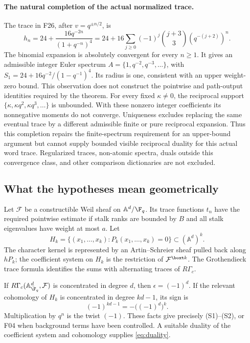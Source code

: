 \documentclass[11pt,a4paper]{article}
\newcommand{\A}{\mathbb A}\newcommand{\PP}{\mathbb P}\newcommand{\GL}{\mathrm{GL}}
\newcommand{\fid}[1]{\textsf{#1}}\newcommand{\gate}[1]{\textsf{#1}}
\theoremstyle{named}\newtheorem{finding}{Finding}[section]
\theoremstyle{definition}\newtheorem{definition}[finding]{Definition}
\theoremstyle{remark}\newtheorem{remark}[finding]{Remark}
\begin{document}
\paragraph{The natural completion of the actual normalized trace.}
The trace in \fid{F26}, after $v=q^{\pm n/2}$, is
\[
 h_n=24+\frac{16q^{-2n}}{(1+q^{-n})^4}
 =24+16\sum_{j\ge0}(-1)^j\binom{j+3}{3}
                   (q^{-(j+2)})^n.
\]
The binomial expansion is absolutely convergent for every $n\ge1$.
It gives an admissible integer Euler spectrum
$A=\{1,q^{-2},q^{-3},\ldots\}$, with
$S_1=24+16q^{-2}/(1-q^{-1})^4$. Its radius is one, consistent with
an upper weight-zero bound. This observation does not construct the
pointwise and path-output identities required by the theorem.
For every fixed $\kappa\ne0$, the reciprocal support
$\{\kappa,\kappa q^2,\kappa q^3,\ldots\}$ is unbounded.
With these nonzero integer coefficients its nonnegative moments do
not converge. Uniqueness excludes replacing the same eventual trace
by a different admissible finite or pure reciprocal expansion.
Thus this completion repairs the finite-spectrum requirement for an
upper-bound argument but cannot supply bounded visible reciprocal
duality for this actual word trace. Regularized traces, non-atomic
spectra, duals outside this convergence class, and other comparison
dictionaries are not excluded.

\subsection{What the hypotheses mean geometrically}\label{sec:tracegeom}
Let $\mathcal F$ be a constructible Weil sheaf on $\A^d/\F_q$. Its trace functions $t_n$ have the required pointwise estimate if stalk ranks are bounded by $B$ and all stalk eigenvalues have weight at most $a$. Let
\[
 H_k=\{(x_1,\ldots,x_k):P_k(x_1,\ldots,x_k)=0\}
 \subset(\A^d)^k.
\]
The character kernel is represented by an Artin--Schreier sheaf pulled back along $hP_k$; the coefficient system on $H_k$ is the restriction of $\mathcal F^{\boxt k}$. The Grothendieck trace formula identifies the sums with alternating traces of $R\Gamma_c$.

If $R\Gamma_c(\A^d_{\bar{\F}_q},\mathcal F)$ is concentrated in degree $d$, then $\epsilon=(-1)^d$. If the relevant cohomology of $H_k$ is concentrated in degree $kd-1$, its sign is
\[
 (-1)^{kd-1}=-\bigl((-1)^d\bigr)^k.
\]
Multiplication by $q^n$ is the twist $(-1)$. These facts give precisely (S1)--(S2), or \fid{F04} when background terms have been controlled. A suitable duality of the coefficient system and cohomology supplies \eqref{eq:duality}.
\end{document}
